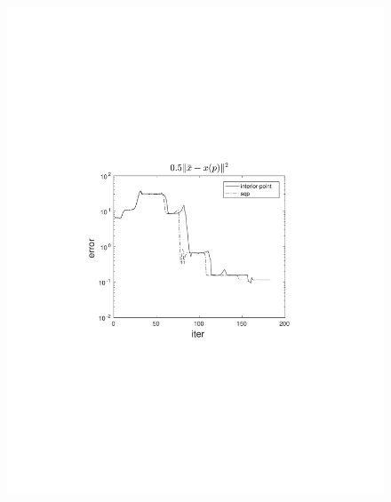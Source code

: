 \documentclass{beamer}
\begin{document}
\begin{frame}
\begin{columns}[t]
\begin{figure}
                \includegraphics[trim=4cm 9cm 4cm 8.5cm, clip=true, width=\linewidth]{img/convPlotX_1}
            \end{figure}
    \end{columns}
\end{frame}
\end{document}
